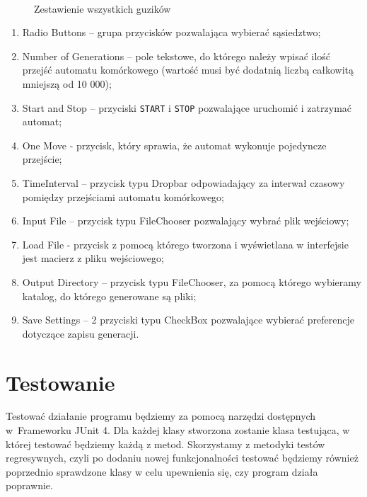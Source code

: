 \documentclass[a4paper,12pt]{article}
\begin{document}
\begin{figure}[H]
	 \\
	\caption{Zestawienie wszystkich guzików}
\end{figure}

\begin{enumerate}[label=(\alph*)]
\item Radio Buttons – grupa przycisków pozwalająca wybierać sąsiedztwo;
\item Number of Generations – pole tekstowe, do którego należy wpisać ilość przejść automatu komórkowego (wartość musi być dodatnią liczbą całkowitą mniejszą od 10 000);
\item Start and Stop – przyciski \texttt{START} i \texttt{STOP} pozwalające uruchomić i zatrzymać automat;
\item One Move - przycisk, który sprawia, że automat wykonuje pojedyncze przejście;
\item TimeInterval – przycisk typu Dropbar odpowiadający za interwał czasowy pomiędzy przejściami automatu komórkowego;
\item Input File – przycisk typu FileChooser pozwalający wybrać plik wejściowy;
\item Load File - przycisk z pomocą którego tworzona i wyświetlana w interfejsie jest macierz z pliku wejściowego;
\item Output Directory – przycisk typu FileChooser, za pomocą którego wybieramy katalog, do którego generowane są pliki;
\item Save Settings – 2 przyciski typu CheckBox pozwalające wybierać preferencje dotyczące zapisu generacji.
\end{enumerate}

\section{Testowanie}
Testować działanie programu będziemy za pomocą narzędzi dostępnych w~Frameworku JUnit 4. Dla każdej klasy stworzona zostanie klasa testująca, w której testować będziemy każdą z metod. Skorzystamy z metodyki testów regresywnych, czyli po dodaniu nowej funkcjonalności testować będziemy również poprzednio sprawdzone klasy w celu upewnienia się, czy program działa poprawnie.
\end{document}
